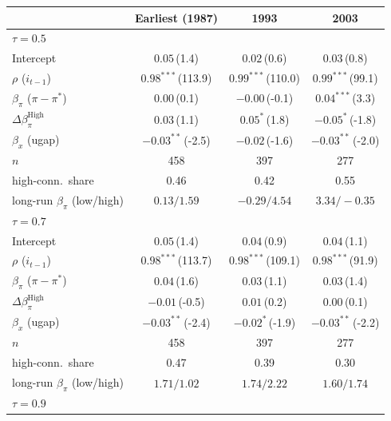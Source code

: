 \setlength{\tabcolsep}{4pt}\scriptsize
\begin{tabular}{lccc}
\toprule
 & Earliest (1987) & 1993 & 2003 \\
\midrule
\multicolumn{4}{l}{\textit{$\tau=0.5$}} \\
Intercept & $0.05$\,{\scriptsize(1.4)} & $0.02$\,{\scriptsize(0.6)} & $0.03$\,{\scriptsize(0.8)} \\
$\rho$ ($i_{t-1}$) & $0.98^{***}$\,{\scriptsize(113.9)} & $0.99^{***}$\,{\scriptsize(110.0)} & $0.99^{***}$\,{\scriptsize(99.1)} \\
$\beta_\pi$ ($\pi-\pi^*$) & $0.00$\,{\scriptsize(0.1)} & $-0.00$\,{\scriptsize(-0.1)} & $0.04^{***}$\,{\scriptsize(3.3)} \\
$\Delta\beta_\pi^{\text{High}}$ & $0.03$\,{\scriptsize(1.1)} & $0.05^{*}$\,{\scriptsize(1.8)} & $-0.05^{*}$\,{\scriptsize(-1.8)} \\
$\beta_x$ (ugap) & $-0.03^{**}$\,{\scriptsize(-2.5)} & $-0.02$\,{\scriptsize(-1.6)} & $-0.03^{**}$\,{\scriptsize(-2.0)} \\
\addlinespace
$n$ & 458 & 397 & 277 \\
high-conn.\ share & 0.46 & 0.42 & 0.55 \\
long-run $\beta_\pi$ (low/high) & $0.13/1.59$ & $-0.29/4.54$ & $3.34/-0.35$ \\
\midrule
\multicolumn{4}{l}{\textit{$\tau=0.7$}} \\
Intercept & $0.05$\,{\scriptsize(1.4)} & $0.04$\,{\scriptsize(0.9)} & $0.04$\,{\scriptsize(1.1)} \\
$\rho$ ($i_{t-1}$) & $0.98^{***}$\,{\scriptsize(113.7)} & $0.98^{***}$\,{\scriptsize(109.1)} & $0.98^{***}$\,{\scriptsize(91.9)} \\
$\beta_\pi$ ($\pi-\pi^*$) & $0.04$\,{\scriptsize(1.6)} & $0.03$\,{\scriptsize(1.1)} & $0.03$\,{\scriptsize(1.4)} \\
$\Delta\beta_\pi^{\text{High}}$ & $-0.01$\,{\scriptsize(-0.5)} & $0.01$\,{\scriptsize(0.2)} & $0.00$\,{\scriptsize(0.1)} \\
$\beta_x$ (ugap) & $-0.03^{**}$\,{\scriptsize(-2.4)} & $-0.02^{*}$\,{\scriptsize(-1.9)} & $-0.03^{**}$\,{\scriptsize(-2.2)} \\
\addlinespace
$n$ & 458 & 397 & 277 \\
high-conn.\ share & 0.47 & 0.39 & 0.30 \\
long-run $\beta_\pi$ (low/high) & $1.71/1.02$ & $1.74/2.22$ & $1.60/1.74$ \\
\midrule
\multicolumn{4}{l}{\textit{$\tau=0.9$}} \\

\end{tabular}
